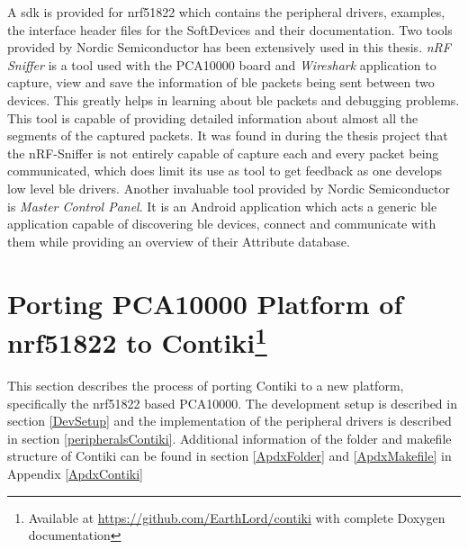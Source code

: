 A \gls{sdk} is provided for nrf51822 which contains the peripheral drivers, examples, the interface header files for the SoftDevices and their documentation. Two tools provided by Nordic Semiconductor has been extensively used in this thesis. \emph{nRF Sniffer} is a tool used with the PCA10000 board and \emph{Wireshark} application to capture, view and save the information of \gls{ble} packets being sent between two devices. This greatly helps in learning about \gls{ble} packets and debugging problems. This tool is capable of providing detailed information about almost all the segments of the captured packets. It was found in during the thesis project that the nRF-Sniffer is not entirely capable of capture each and every packet being communicated, which does limit its use as tool to get feedback as one develops low level \gls{ble} drivers. Another invaluable tool provided by Nordic Semiconductor is \emph{Master Control Panel}. It is an Android application which acts a generic \gls{ble} application capable of discovering \gls{ble} devices, connect and communicate with them while providing an overview of their Attribute database. 

%

\section[Porting PCA10000 Platform of nrf51822 to Contiki]{Porting PCA10000 Platform of nrf51822 to Contiki\footnote{Available at \url{https://github.com/EarthLord/contiki} with complete Doxygen documentation}} \label{5Porting}

This section describes the process of porting Contiki to a new platform, specifically the nrf51822 based PCA10000. The development setup is described in section \ref{DevSetup} and the implementation of the peripheral drivers is described in section \ref{peripheralsContiki}. Additional information of the folder and makefile structure of Contiki can be found in section \ref{ApdxFolder} and \ref{ApdxMakefile} in Appendix \ref{ApdxContiki}

